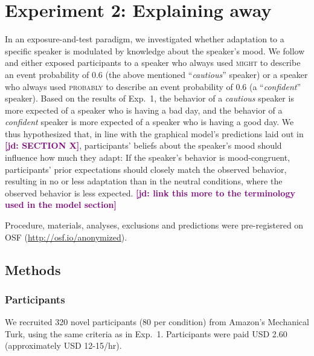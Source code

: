 \documentclass[man,floatsintext]{apa6}
\newcommand{\jd}[1]{\textcolor{Purple}{\bf [jd: #1]}}
\newcommand{\seb}[1]{\textcolor{Red}{\bf [Seb: #1]}}
\begin{document}


\section{Experiment 2: Explaining away}

In an exposure-and-test paradigm, we investigated whether adaptation to a specific speaker is modulated by knowledge about the speaker's mood. We follow  and either exposed participants to a speaker who always used \textsc{might} to describe an event probability of 0.6 (the above mentioned ``\textit{cautious}'' speaker) or a speaker who always used \textsc{probably} to describe an event probability of 0.6 (a ``\textit{confident}'' speaker). Based on the results of Exp.~1, the behavior of a \textit{cautious} speaker is more expected of a speaker who is having a bad day, and the behavior of a \textit{confident} speaker is more expected of a speaker who is having a good day. We thus hypothesized that, in line with the graphical model's predictions laid out in \jd{SECTION X}, participants' beliefs about the speaker's mood should influence how much they adapt: If the speaker's behavior is mood-congruent, participants' prior expectations should closely match the observed behavior, resulting in no or less adaptation than in the neutral conditions, where the observed behavior is less expected. \jd{link this more to the terminology used in the model section}

Procedure, materials, analyses, exclusions and predictions were pre-registered on OSF (\url{http://osf.io/anonymized}).

\subsection{Methods}

\subsubsection{Participants} We recruited 320 novel participants (80 per condition) from Amazon's Mechanical Turk, using the same criteria as in Exp.~1. Participants were paid USD 2.60 (approximately USD 12-15/hr).
\end{document}
